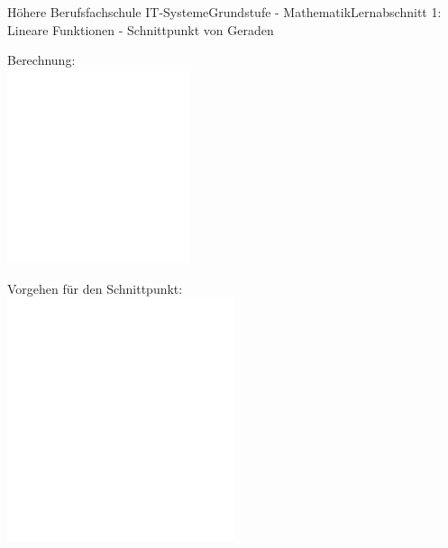 \documentclass[oneside,openany,headings=optiontotoc,11pt,numbers=noenddot]{scrreprt}
\begin{document}
\begin{worksheet}{Höhere Berufsfachschule IT-Systeme}{Grundstufe - Mathematik}{Lernabschnitt 1: Lineare Funktionen - Schnittpunkt von Geraden}
\begin{framed}
		\end{framed}
		\begin{framed}
			\noindent
			\small{\color{codegray}Berechnung:}\\
			\includegraphics[width=0.4\textwidth]{../../empty.jpg}
		\end{framed}
		\begin{framed}
			\noindent
			\small{\color{codegray}Vorgehen für den Schnittpunkt:}\\
			\includegraphics[width=0.5\textwidth]{../../empty.jpg}
		\end{framed}
	\end{worksheet}
\end{document}

